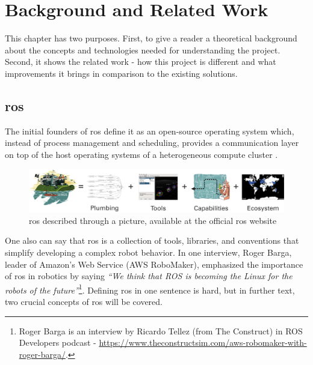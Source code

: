 \chapter{Background and Related Work}
\label{chap:background}

This chapter has two purposes.
First, to give a reader a theoretical background about the concepts and technologies needed for understanding the project.
Second, it shows the related work - how this project is different and what improvements it brings in comparison to the existing solutions.

\section{\ac{ros}}

The initial founders of \ac{ros} define it as an open-source operating system which, instead of process management and scheduling, provides a communication layer on top of the host operating systems of a heterogeneous compute cluster \cite{quigley_ros_2009}.

\begin{figure}[H]
    \centering
    \includegraphics[width=\textwidth]{background/figures/ros_equation.png}
    \caption{\ac{ros} described through a picture, available at the official \ac{ros} website}
    \label{fig:background:ros_equation}
\end{figure}

One also can say that \ac{ros} is a collection of tools, libraries, and conventions that simplify developing a complex robot behavior.
In one interview, Roger Barga, leader of Amazon's Web Service (AWS RoboMaker), emphasized the importance of \ac{ros} in robotics by saying \textit{``We think that ROS is becoming the Linux for the robots of the future''}\footnote{Roger Barga is an interview by Ricardo Tellez (from The Construct) in ROS Developers podcast -    \url{https://www.theconstructsim.com/aws-robomaker-with-roger-barga/}.}.
Defining \ac{ros} in one sentence is hard, but in further text, two crucial concepts of \ac{ros} will be covered.


